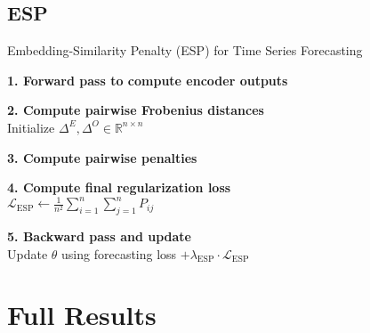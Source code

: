 \documentclass{article}
\begin{document}
\subsection{ESP}
\begin{algorithm}[H]
\caption{Embedding-Similarity Penalty (ESP) for Time Series Forecasting}
\label{alg:esp}

\SetAlgoNoLine
\DontPrintSemicolon

\textbf{1. Forward pass to compute encoder outputs} \\

\textbf{2. Compute pairwise Frobenius distances} \\
Initialize $\Delta^{E}, \Delta^{O} \in \mathbb{R}^{n \times n}$\\

\textbf{3. Compute pairwise penalties} \\

\textbf{4. Compute final regularization loss} \\
$\mathcal{L}_{\mathrm{ESP}} \gets \frac{1}{n^2} \sum_{i=1}^{n} \sum_{j=1}^{n} P_{ij}$

\textbf{5. Backward pass and update} \\
Update $\theta$ using forecasting loss $+ \lambda_{\mathrm{ESP}} \cdot \mathcal{L}_{\mathrm{ESP}}$

\end{algorithm}

\section{Full Results}
\end{document}
